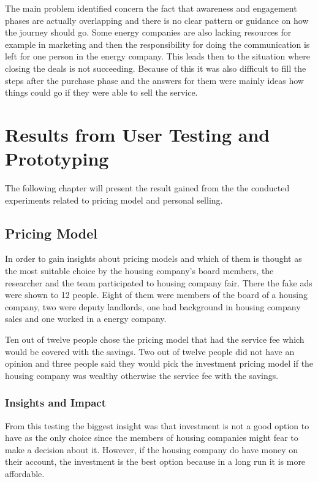 The main problem identified concern the fact that awareness and engagement phases are actually overlapping and there is no clear pattern or guidance on how the journey should go. Some energy companies are also lacking resources for example in marketing and then the responsibility for doing the communication is left for one person in the energy company. This leads then to the situation where closing the deals is not succeeding. Because of this it was also difficult to fill the steps after the purchase phase and the answers for them were mainly ideas how things could go if they were able to sell the service.

\section{Results from User Testing and Prototyping}

The following chapter will present the result gained from the the conducted experiments related to pricing model and personal selling. 

\subsection{Pricing Model}

In order to gain insights about pricing models and which of them is thought as the most suitable choice by the housing company's board members, the researcher and the team participated to housing company fair. There the fake ads were shown to 12 people. Eight of them were members of the board of a housing company, two were deputy landlords, one had background in housing company sales and one worked in a energy company.

Ten out of twelve people chose the pricing model that had the service fee which would be covered with the savings. Two out of twelve people did not have an opinion and three people said they would pick the investment pricing model if the housing company was wealthy otherwise the service fee with the savings.

\subsubsection*{Insights and Impact}

From this testing the biggest insight was that investment is not a good option to have as the only choice since the members of housing companies might fear to make a decision about it. However, if the housing company do have money on their account, the investment is the best option because in a long run it is more affordable.

